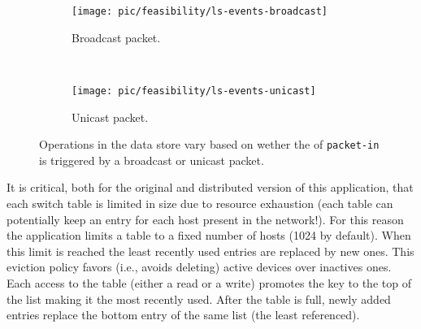 \begin{figure}[ht]
  \begin{subfigure}[b]{0.5\textwidth}
                \centering
                \texttt{[image: pic/feasibility/ls-events-broadcast]}
                \caption{Broadcast packet.}
                \label{fig:ls:interaction:broadcast}
        \end{subfigure}%
        ~
        \begin{subfigure}[b]{0.5\textwidth}
                \centering
                \texttt{[image: pic/feasibility/ls-events-unicast]}
                \caption{Unicast packet.}
                \label{fig:ls:interaction:unicast}
        \end{subfigure}
        \caption[Learning Switch workloads]{Operations in the data store vary based on wether the \gls{of} \texttt{packet-in} is triggered by a broadcast or unicast packet.}
        \label{fig:ls:interaction}
\end{figure}


It is critical, both for the original and distributed version of this application, that each switch table is limited in size due to resource exhaustion (each table can potentially keep an entry for each host present in the network!).
For this reason the application limits a table to a fixed number of hosts (1024 by default).
When this limit is reached the least recently used entries are replaced by new ones.  
This eviction policy favors (i.e., avoids deleting) active devices over inactives ones.
Each access to the table (either a read or a write) promotes the key to the top of the list making it the most recently used.
After the table is full, newly added entries replace the bottom entry of the same list (the least referenced). 

